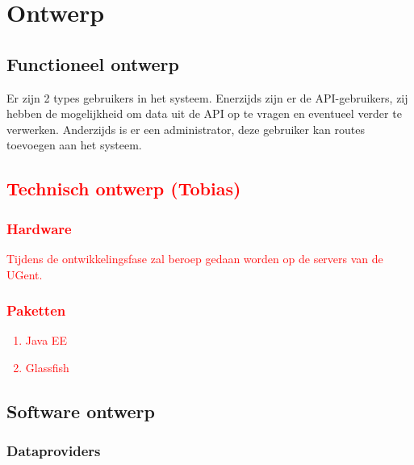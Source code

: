\documentclass[ps,a4paper,oneside]{report}
\begin{document}
\chapter{Ontwerp}
\section{Functioneel ontwerp}
Er zijn 2 types gebruikers in het systeem. Enerzijds zijn er de API-gebruikers, zij hebben de mogelijkheid om data uit de API op te vragen en eventueel verder te verwerken. Anderzijds is er een administrator, deze gebruiker kan routes toevoegen aan het systeem.
\textcolor{red}{\section{Technisch ontwerp (Tobias)}
\subsection{Hardware}
Tijdens de ontwikkelingsfase zal beroep gedaan worden op de servers van de UGent.
\subsection{Paketten}
\begin{enumerate}
	\item Java EE
	\item Glassfish
\end{enumerate}
}
\section{Software ontwerp}
\subsection{Dataproviders}
\end{document}
